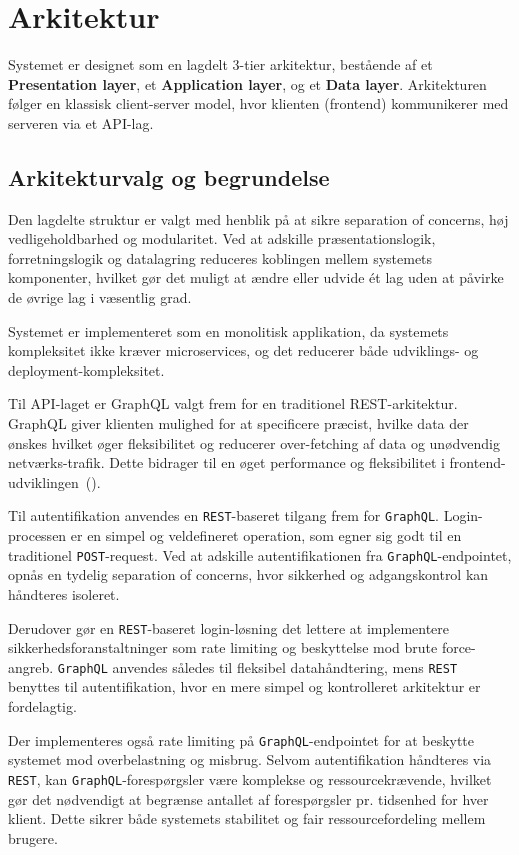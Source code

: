 \section{Arkitektur}

Systemet er designet som en lagdelt 3-tier arkitektur, bestående af et \textbf{Presentation layer},
et \textbf{Application layer}, og et \textbf{Data layer}.
Arkitekturen følger en klassisk client-server model, hvor klienten (frontend) kommunikerer
med serveren via et API-lag.

\subsection{Arkitekturvalg og begrundelse}

Den lagdelte struktur er valgt med henblik på at sikre separation of concerns, høj vedligeholdbarhed og modularitet.
Ved at adskille præsentationslogik, forretningslogik og datalagring reduceres koblingen mellem systemets
komponenter, hvilket gør det muligt at ændre eller udvide ét lag uden at påvirke de øvrige lag i væsentlig grad.

Systemet er implementeret som en monolitisk applikation, da systemets kompleksitet ikke kræver microservices, og
det reducerer både udviklings- og deployment-kompleksitet.

Til API-laget er GraphQL valgt frem for en traditionel REST-arkitektur.
GraphQL giver klienten mulighed for at specificere præcist, hvilke data der ønskes
hvilket øger fleksibilitet og reducerer over-fetching af data og unødvendig netværks-trafik.
Dette bidrager til en øget performance og fleksibilitet i frontend-udviklingen\ (\cite{graphql}).

Til autentifikation anvendes en \texttt{REST}-baseret tilgang frem for \texttt{GraphQL}.
Login-processen er en simpel og veldefineret operation, som egner sig godt til en traditionel \texttt{POST}-request.
Ved at adskille autentifikationen fra \texttt{GraphQL}-endpointet, opnås en tydelig separation of concerns, hvor sikkerhed
og adgangskontrol kan håndteres isoleret.

Derudover gør en \texttt{REST}-baseret login-løsning det lettere at implementere sikkerhedsforanstaltninger som rate limiting
og beskyttelse mod brute force-angreb.
\texttt{GraphQL} anvendes således til fleksibel datahåndtering, mens \texttt{REST} benyttes til autentifikation, hvor en mere
simpel og kontrolleret arkitektur er fordelagtig.

Der implementeres også rate limiting på \texttt{GraphQL}-endpointet for at beskytte systemet mod overbelastning og misbrug.
Selvom autentifikation håndteres via \texttt{REST}, kan \texttt{GraphQL}-forespørgsler være komplekse og ressourcekrævende,
hvilket gør det nødvendigt at begrænse antallet af forespørgsler pr. tidsenhed for hver klient.
Dette sikrer både systemets stabilitet og fair ressourcefordeling mellem brugere.

